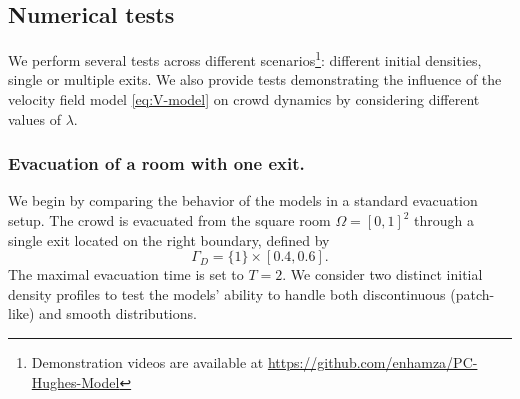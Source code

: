 \documentclass[final,reqno]{amsart}
\theoremstyle{plain}
\theoremstyle{definition}
\theoremstyle{remark}
\numberwithin{remark}{section}	%
\numberwithin{example}{section}	%
\begin{document}
\subsection{Numerical tests}\label{section:tests}
We perform several tests across different scenarios\footnote{Demonstration videos are available at \url{https://github.com/enhamza/PC-Hughes-Model}}: different initial densities, single or multiple exits. We also provide tests demonstrating the influence of the velocity field model \eqref{eq:V-model} on crowd dynamics by considering different values of $\lambda$. 

\subsubsection{Evacuation of a room with one exit.}
We begin by comparing the behavior of the models in a standard evacuation setup. The crowd is evacuated from the square room $\Omega=[0,1]^2$ through a single exit located on the right boundary, defined by
\begin{equation}
    \Gamma_D = \{1\} \times [0.4, 0.6].
\end{equation}
The maximal evacuation time is set to $T=2$.
We consider two distinct initial density profiles to test the models' ability to handle both discontinuous (patch-like) and smooth distributions.
\end{document}
